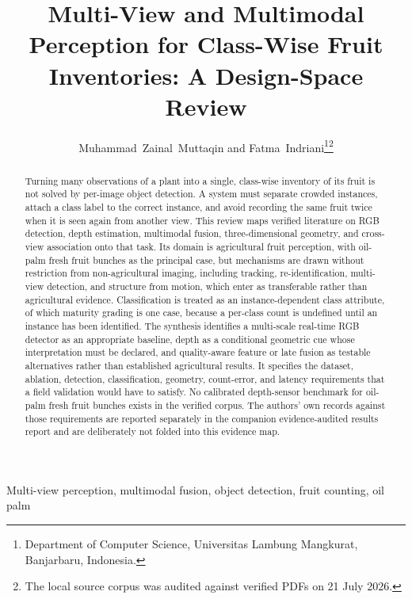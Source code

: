 \documentclass[journal]{IEEEtran}
\begin{document}
\title{Multi-View and Multimodal Perception for Class-Wise Fruit Inventories: A Design-Space Review}
\author{Muhammad~Zainal~Muttaqin and Fatma~Indriani\thanks{Department of Computer Science, Universitas Lambung Mangkurat, Banjarbaru, Indonesia.}\thanks{The local source corpus was audited against verified PDFs on 21 July 2026.}}
\maketitle
\begin{abstract}
Turning many observations of a plant into a single, class-wise inventory of its
fruit is not solved by per-image object detection. A system must separate
crowded instances, attach a class label to the correct instance, and avoid
recording the same fruit twice when it is seen again from another view. This
review maps verified literature on RGB detection, depth estimation, multimodal
fusion, three-dimensional geometry, and cross-view association onto that task.
Its domain is agricultural fruit perception, with oil-palm fresh fruit bunches
as the principal case, but mechanisms are drawn without restriction from
non-agricultural imaging, including tracking, re-identification, multi-view
detection, and structure from motion, which enter as transferable rather than
agricultural evidence. Classification is treated as an instance-dependent class
attribute, of which maturity grading is one case, because a per-class count is
undefined until an instance has been identified. The synthesis identifies a
multi-scale real-time RGB detector as an appropriate baseline, depth as a
conditional geometric cue whose interpretation must be declared, and
quality-aware feature or late fusion as testable alternatives rather than
established agricultural results. It specifies the dataset, ablation, detection,
classification, geometry, count-error, and latency requirements that a field
validation would have to satisfy. No calibrated depth-sensor benchmark for
oil-palm fresh fruit bunches exists in the verified corpus. The authors' own
records against those requirements are reported separately in the companion
evidence-audited results report and are deliberately not folded into this
evidence map.
\end{abstract}
\begin{IEEEkeywords}Multi-view perception, multimodal fusion, object detection, fruit counting, oil palm\end{IEEEkeywords}




\end{document}
